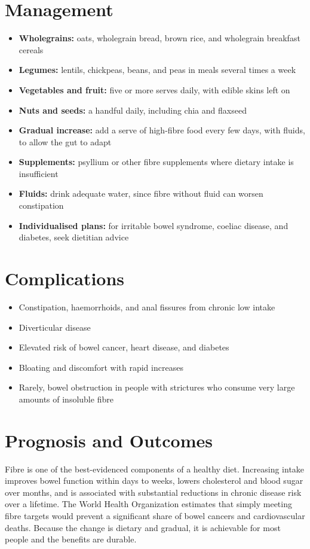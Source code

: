 \section*{Management}
\begin{itemize}
    \item \textbf{Wholegrains:} oats, wholegrain bread, brown rice, and wholegrain breakfast cereals
    \item \textbf{Legumes:} lentils, chickpeas, beans, and peas in meals several times a week
    \item \textbf{Vegetables and fruit:} five or more serves daily, with edible skins left on
    \item \textbf{Nuts and seeds:} a handful daily, including chia and flaxseed
    \item \textbf{Gradual increase:} add a serve of high-fibre food every few days, with fluids, to allow the gut to adapt
    \item \textbf{Supplements:} psyllium or other fibre supplements where dietary intake is insufficient
    \item \textbf{Fluids:} drink adequate water, since fibre without fluid can worsen constipation
    \item \textbf{Individualised plans:} for irritable bowel syndrome, coeliac disease, and diabetes, seek dietitian advice
\end{itemize}

\section*{Complications}
\begin{itemize}
    \item Constipation, haemorrhoids, and anal fissures from chronic low intake
    \item Diverticular disease
    \item Elevated risk of bowel cancer, heart disease, and diabetes
    \item Bloating and discomfort with rapid increases
    \item Rarely, bowel obstruction in people with strictures who consume very large amounts of insoluble fibre
\end{itemize}

\section*{Prognosis and Outcomes}
Fibre is one of the best-evidenced components of a healthy diet. Increasing intake improves bowel function within days to weeks, lowers cholesterol and blood sugar over months, and is associated with substantial reductions in chronic disease risk over a lifetime. The World Health Organization estimates that simply meeting fibre targets would prevent a significant share of bowel cancers and cardiovascular deaths. Because the change is dietary and gradual, it is achievable for most people and the benefits are durable.


